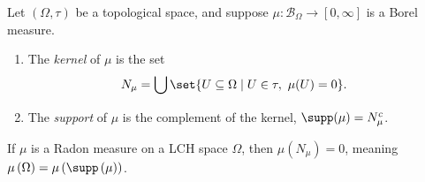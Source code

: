 \begin{definition}
  Let $\left(\Omega,\tau\right)$ be a topological space, and suppose $\mu\colon \mathcal{B}_{\Omega}\rightarrow [0,\infty]$ is a Borel measure.
  \begin{enumerate}[(1)]
    \item The \textit{kernel} of $\mu$ is the set
      \begin{align*}
        N_{\mu} &= \bigcup\set{U\subseteq \Omega\mid U\in\tau,~\mu(U) = 0}.
      \end{align*}
    \item The \textit{support} of $\mu$ is the complement of the kernel, $\supp(\mu) = N_{\mu}^{c}$.
  \end{enumerate}
\end{definition}
\begin{fact}
  If $\mu$ is a Radon measure on a LCH space $\Omega$, then $\mu\left(N_{\mu}\right) = 0$, meaning $\mu\left(\Omega\right) = \mu\left(\supp\left(\mu\right)\right)$.
\end{fact}

